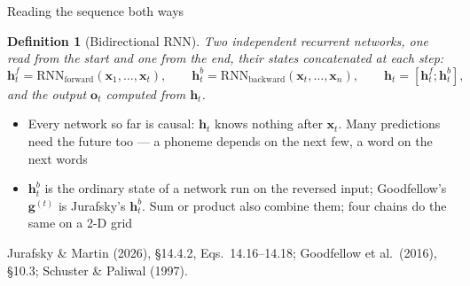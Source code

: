 \documentclass[aspectratio=169, 11pt]{beamer}
\newtheorem{defx}[theorem]{Definition}
\newcommand{\srcline}[1]{%
  \par\vspace{0.25em}%
  {\scriptsize\color{mcMuted}\hfill #1\par}}
\newcommand{\src}[3]{}      %
\begin{document}
\begin{frame}{Reading the sequence both ways}
  \src{jurafsky_slp3}{equation}{14.16-14.18}
  \src{jurafsky_slp3}{section}{14.4.2}
  \src{goodfellow2016}{section}{10.3}
  \src{schuster1997}{section}{II.B}
  \vspace{-0.45em}
  \begin{defx}[Bidirectional RNN]\label{th:bi}
    \small
    Two independent recurrent networks, one read from the start and one
    from the end, their states concatenated at each step:
    \[
      \mathbf{h}^{f}_t = \mathrm{RNN}_{\mathrm{forward}}(\mathbf{x}_1, \ldots, \mathbf{x}_t), \qquad
      \mathbf{h}^{b}_t = \mathrm{RNN}_{\mathrm{backward}}(\mathbf{x}_t, \ldots, \mathbf{x}_n), \qquad
      \mathbf{h}_t = [\mathbf{h}^{f}_t ; \mathbf{h}^{b}_t],
    \]
    and the output $\mathbf{o}_t$ computed from $\mathbf{h}_t$.
  \end{defx}
  \vspace{-0.1em}
  {\footnotesize
  \begin{itemize}\itemsep0.16em
    \item Every network so far is \alert{causal}: $\mathbf{h}_t$ knows
          nothing after $\mathbf{x}_t$. Many predictions need the future
          too --- a phoneme depends on the next few, a word on the next words
    \item $\mathbf{h}^{b}_t$ is the ordinary state of a network run on the
          reversed input; Goodfellow's $\mathbf{g}^{(t)}$ is Jurafsky's
          $\mathbf{h}^{b}_t$. Sum or product also combine them; four chains
          do the same on a 2-D grid
  \end{itemize}}
  \vspace{-0.3em}
  \srcline{Jurafsky \& Martin (2026), \S14.4.2, Eqs.~14.16--14.18; Goodfellow et al.\ (2016), \S10.3; Schuster \& Paliwal (1997).}
\end{frame}
\end{document}
